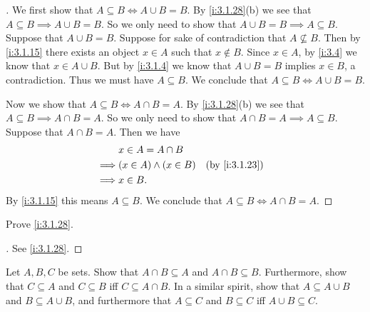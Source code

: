\begin{proof}[]
  We first show that \(A \subseteq B \iff A \cup B = B\).
  By \cref{i:3.1.28}(b) we see that \(A \subseteq B \implies A \cup B = B\).
  So we only need to show that \(A \cup B = B \implies A \subseteq B\).
  Suppose that \(A \cup B = B\).
  Suppose for sake of contradiction that \(A \not\subseteq B\).
  Then by \cref{i:3.1.15} there exists an object \(x \in A\) such that \(x \notin B\).
  Since \(x \in A\), by \cref{i:3.4} we know that \(x \in A \cup B\).
  But by \cref{i:3.1.4} we know that \(A \cup B = B\) implies \(x \in B\), a contradiction.
  Thus we must have \(A \subseteq B\).
  We conclude that \(A \subseteq B \iff A \cup B = B\).

  Now we show that \(A \subseteq B \iff A \cap B = A\).
  By \cref{i:3.1.28}(b) we see that \(A \subseteq B \implies A \cap B = A\).
  So we only need to show that \(A \cap B = A \implies A \subseteq B\).
  Suppose that \(A \cap B = A\).
  Then we have
  \begin{align*}
             & x \in A = A \cap B                           \\
    \implies & (x \in A) \land (x \in B) &  & \by{i:3.1.23} \\
    \implies & x \in B.
  \end{align*}
  By \cref{i:3.1.15} this means \(A \subseteq B\).
  We conclude that \(A \subseteq B \iff A \cap B = A\).
\end{proof}

\begin{ex}\label{i:ex:3.1.6}
  Prove \cref{i:3.1.28}.
\end{ex}

\begin{proof}[]
  See \cref{i:3.1.28}.
\end{proof}

\begin{ex}\label{i:ex:3.1.7}
  Let \(A, B, C\) be sets.
  Show that \(A \cap B \subseteq A\) and \(A \cap B \subseteq B\).
  Furthermore, show that \(C \subseteq A\) and \(C \subseteq B\) iff \(C \subseteq A \cap B\).
  In a similar spirit, show that \(A \subseteq A \cup B\) and \(B \subseteq A \cup B\), and furthermore that \(A \subseteq C\) and \(B \subseteq C\) iff \(A \cup B \subseteq C\).
\end{ex}

